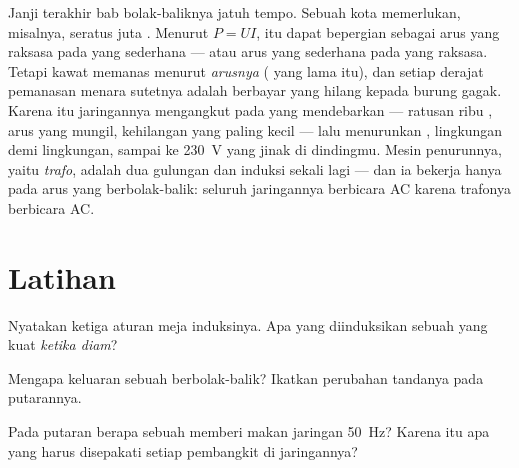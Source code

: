 \begin{remark}\label{rem:g9:alternator:transport}
Janji terakhir bab bolak-baliknya jatuh tempo. Sebuah kota memerlukan,
misalnya, seratus juta . Menurut $P = U I$,  itu dapat
bepergian sebagai arus yang raksasa pada  yang sederhana ---
atau arus yang sederhana pada  yang raksasa. Tetapi kawat
memanas menurut \emph{arusnya} ( yang lama itu), dan setiap
derajat pemanasan menara sutetnya adalah  berbayar yang hilang
kepada burung gagak. Karena itu jaringannya mengangkut pada 
yang mendebarkan --- ratusan ribu , arus yang mungil, kehilangan
yang paling kecil --- lalu menurunkan , lingkungan demi
lingkungan, sampai ke \qty{230}{V} yang jinak di dindingmu. Mesin
penurunnya, yaitu \emph{trafo}, adalah dua gulungan dan induksi sekali
lagi --- dan ia bekerja hanya pada arus yang berbolak-balik: seluruh
jaringannya berbicara AC karena trafonya berbicara AC.
\end{remark}

\section{Latihan}

\begin{exercise}[$\star$]\label{exo:g9:alternator:1}
Nyatakan ketiga aturan meja induksinya. Apa yang diinduksikan sebuah
 yang kuat \emph{ketika diam}?
\end{exercise}

\begin{exercise}[$\star$]\label{exo:g9:alternator:2}
Mengapa keluaran sebuah  berbolak-balik? Ikatkan perubahan
tandanya pada putarannya.
\end{exercise}

\begin{exercise}[$\star$]\label{exo:g9:alternator:3}
Pada  putaran berapa sebuah  memberi makan jaringan
\qty{50}{Hz}? Karena itu apa yang harus disepakati setiap pembangkit
di jaringannya?
\end{exercise}

